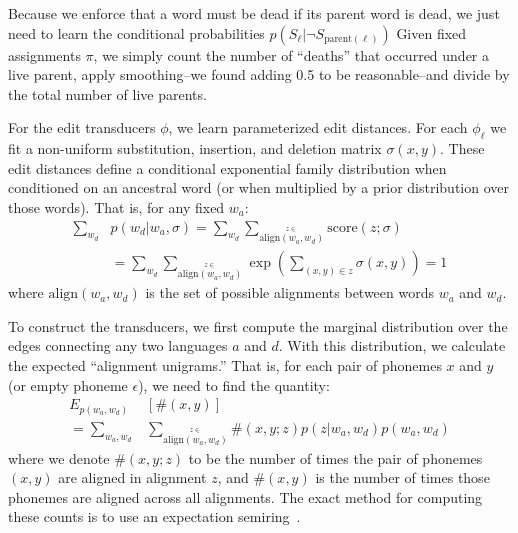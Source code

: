 \documentclass[11pt,a4paper]{article}
\begin{document}
Because we enforce that a word must be dead if its parent word is
dead, we just need to learn the conditional probabilities $p(S_\ell|\neg
S_{\mathrm{parent}(\ell)})$ Given fixed assignments $\pi$, we simply
count the number of ``deaths'' that occurred under a live parent,
apply smoothing--we found adding 0.5 to be reasonable--and divide
by the total number of live parents.

For the edit transducers $\phi$, we learn parameterized edit
distances.  For each $\phi_\ell$ we fit a non-uniform substitution,
insertion, and deletion matrix $\sigma(x,y)$. These edit distances
define a conditional exponential family distribution when conditioned
on an ancestral word (or when multiplied by a prior distribution
over those words). That is, for any fixed $w_a$:
\begin{equation*}
  \begin{split}
    \sum_{w_d} &p(w_d|w_a,\sigma) = \sum_{w_d} \sum_{\stackrel{z\in}{\scriptscriptstyle\mathrm{align}(w_a,w_d)}} \mathrm{score}(z;\sigma) \\
    &= \sum_{w_d} \sum_{\stackrel{z\in}{\scriptscriptstyle\mathrm{align}(w_a,w_d)}} \exp( \sum_{(x,y)\in z} \sigma(x,y)) = 1
   \end{split}
 \end{equation*}
where $\mathrm{align}(w_a,w_d)$ is the set of possible alignments between words $w_a$ and $w_d$.

To construct the transducers, we first compute the marginal
distribution over the edges connecting any two languages $a$ and
$d$. With this distribution, we calculate the expected ``alignment
unigrams.'' That is,  for each pair of phonemes $x$ and $y$ (or
empty phoneme $\epsilon$), we need to find the quantity:
\begin{equation*}
  \begin{split}
    E_{p(w_a,w_d)}&[\#(x,y)] \\ = \sum_{w_a,w_d} &\sum_{\stackrel{z\in}{\scriptscriptstyle\mathrm{align}(w_a,w_d)}} \#(x,y;z) p(z|w_a,w_d)p(w_a,w_d)
   \end{split}
 \end{equation*}
where we denote $\#(x,y;z)$ to be the number of times the pair of
phonemes $(x,y)$ are aligned in alignment $z$, and $\#(x,y)$ is the
number of times those phonemes are aligned across all alignments.
The exact method for computing these counts is to use an expectation
semiring~\cite{eisner2001expectation}.
\end{document}
